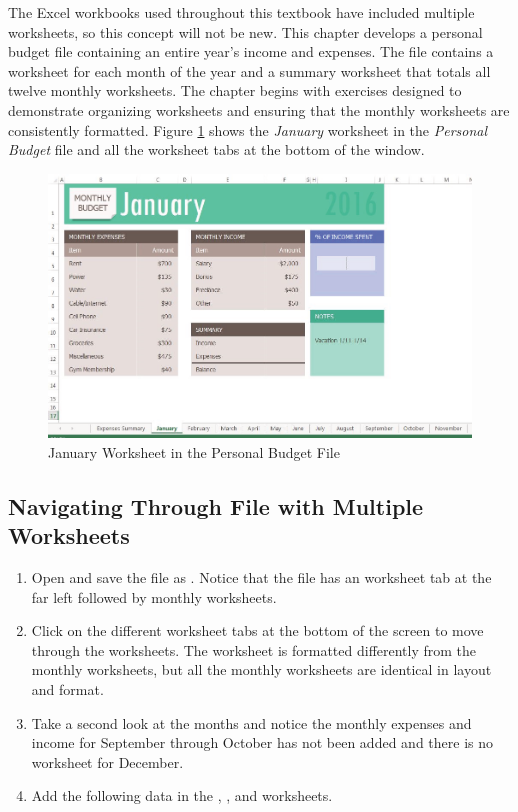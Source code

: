 The Excel workbooks used throughout this textbook have included multiple worksheets, so this concept will not be new. This chapter develops a personal budget file containing an entire year's income and expenses. The file contains a worksheet for each month of the year and a summary worksheet that totals all twelve monthly worksheets. The chapter begins with exercises designed to demonstrate organizing worksheets and ensuring that the monthly worksheets are consistently formatted. Figure \ref{06:fig01} shows the \textit{January} worksheet in the \textit{Personal Budget} file and all the worksheet tabs at the bottom of the window.

\begin{figure}[H]
	\centering
	\includegraphics[width=\maxwidth{.95\linewidth}]{gfx/ch06_fig01}
	\caption{January Worksheet in the Personal Budget File}
	\label{06:fig01}
\end{figure}

\subsection{Navigating Through File with Multiple Worksheets}

\begin{enumbox}
	\begin{enumerate}
		\item Open  and save the file as . Notice that the file has an  worksheet tab at the far left followed by monthly worksheets.
		\item Click on the different worksheet tabs at the bottom of the screen to move through the worksheets. The  worksheet is formatted differently from the monthly worksheets, but all the monthly worksheets are identical in layout and format.
		\item Take a second look at the months and notice the monthly expenses and income for September through October has not been added and there is no worksheet for December. 
		\item Add the following data in the , , and  worksheets.
	\end{enumerate}
\end{enumbox}

